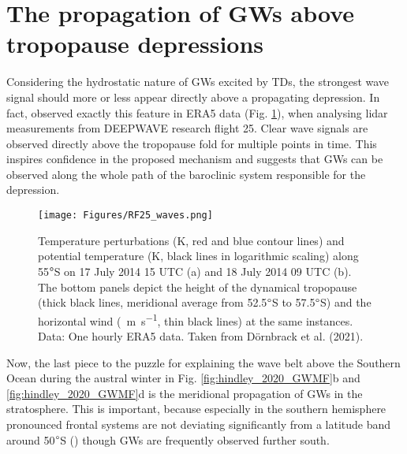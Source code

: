\section{The propagation of GWs above tropopause depressions}
\label{sec:propagation}

Considering the hydrostatic nature of GWs excited by TDs, the strongest wave signal should more or less appear directly above a propagating depression. In fact, \textcite{dornbrack_stratospheric_2022} observed exactly this feature in ERA5 data (Fig. \ref{fig:RF25_waves}), when analysing lidar measurements from DEEPWAVE research flight 25. Clear wave signals are observed directly above the tropopause fold for multiple points in time. This inspires confidence in the proposed mechanism and suggests that GWs can be observed along the whole path of the baroclinic system responsible for the depression.
%
\begin{figure*}[ht]
    \centering
    \texttt{[image: Figures/RF25\_waves.png]}
    \caption{Temperature perturbations (K, red and blue contour lines) and potential temperature (K, black lines in logarithmic scaling) along 55$\degree$S on 17 July 2014 15 UTC (a) and 18 July 2014 09 UTC (b). The bottom panels depict the height of the dynamical tropopause (thick black lines, meridional average from 52.5$\degree$S to 57.5$\degree$S) and the horizontal wind (\SI{}{\meter\second^{-1}}, thin black lines) at the same instances. Data: One hourly ERA5 data. Taken from Dörnbrack et al. (2021).}
    \label{fig:RF25_waves}
\end{figure*}
%
Now, the last piece to the puzzle for explaining the wave belt above the Southern Ocean during the austral winter in Fig. \ref{fig:hindley_2020_GWMF}b and \ref{fig:hindley_2020_GWMF}d is the meridional propagation of GWs in the stratosphere. This is important, because especially in the southern hemisphere pronounced frontal systems are not deviating significantly from a latitude band around 50$\degree$S (\cite{skerlak_tropopause_2015}) though GWs are frequently observed further south.

